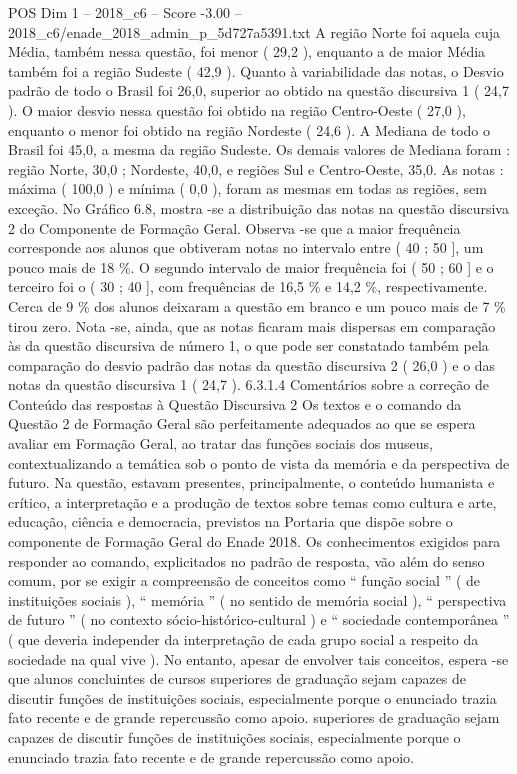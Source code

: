 \begin{textsample}{POS Dim 1 – 2018\_c6 – Score -3.00 – 2018\_c6/enade\_2018\_admin\_p\_5d727a5391.txt}
A região Norte foi aquela cuja Média, também nessa questão, foi menor ( 29,2 ), enquanto a de maior Média também foi a região Sudeste ( 42,9 ).
Quanto à variabilidade das notas, o Desvio padrão de todo o Brasil foi 26,0, superior ao obtido na questão discursiva 1 ( 24,7 ).
O maior desvio nessa questão foi obtido na região Centro-Oeste ( 27,0 ), enquanto o menor foi obtido na região Nordeste ( 24,6 ).
A Mediana de todo o Brasil foi 45,0, a mesma da região Sudeste.
Os demais valores de Mediana foram : região Norte, 30,0 ; Nordeste, 40,0, e regiões Sul e Centro-Oeste, 35,0.
As notas : máxima ( 100,0 ) e mínima ( 0,0 ), foram as mesmas em todas as regiões, sem exceção.
No Gráfico 6.8, mostra -se a distribuição das notas na questão discursiva 2 do Componente de Formação Geral.
Observa -se que a maior frequência corresponde aos alunos que obtiveram notas no intervalo entre ( 40 ; 50 ], um pouco mais de 18 \%.
O segundo intervalo de maior frequência foi ( 50 ; 60 ] e o terceiro foi o ( 30 ; 40 ], com frequências de 16,5 \% e 14,2 \%, respectivamente.
Cerca de 9 \% dos alunos deixaram a questão em branco e um pouco mais de 7 \% tirou zero.
Nota -se, ainda, que as notas ficaram mais dispersas em comparação às da questão discursiva de número 1, o que pode ser constatado também pela comparação do desvio padrão das notas da questão discursiva 2 ( 26,0 ) e o das notas da questão discursiva 1 ( 24,7 ). 6.3.1.4 Comentários sobre a correção de Conteúdo das respostas à Questão Discursiva 2 Os textos e o comando da Questão 2 de Formação Geral são perfeitamente adequados ao que se espera avaliar em Formação Geral, ao tratar das funções sociais dos museus, contextualizando a temática sob o ponto de vista da memória e da perspectiva de futuro.
Na questão, estavam presentes, principalmente, o conteúdo humanista e crítico, a interpretação e a produção de textos sobre temas como cultura e arte, educação, ciência e democracia, previstos na Portaria que dispõe sobre o componente de Formação Geral do Enade 2018.
Os conhecimentos exigidos para responder ao comando, explicitados no padrão de resposta, vão além do senso comum, por se exigir a compreensão de conceitos como “ função social ” ( de instituições sociais ), “ memória ” ( no sentido de memória social ), “ perspectiva de futuro ” ( no contexto sócio-histórico-cultural ) e “ sociedade contemporânea ” ( que deveria independer da interpretação de cada grupo social a respeito da sociedade na qual vive ).
No entanto, apesar de envolver tais conceitos, espera -se que alunos concluintes de cursos superiores de graduação sejam capazes de discutir funções de instituições sociais, especialmente porque o enunciado trazia fato recente e de grande repercussão como apoio. superiores de graduação sejam capazes de discutir funções de instituições sociais, especialmente porque o enunciado trazia fato recente e de grande repercussão como apoio.

\end{textsample}
